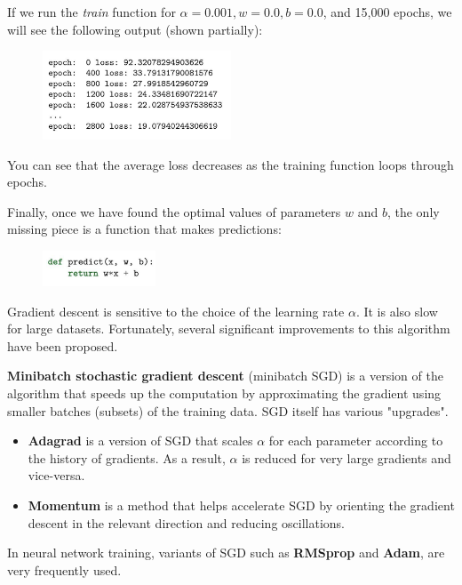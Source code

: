 \documentclass[9pt,dvipsnames]{beamer}
\begin{document}
\begin{frame}
	If we run the \textit{train} function for $\alpha=0.001, w=0.0, b=0.0$, and 15,000 epochs, we will see the following output (shown partially):
	\begin{figure}
		\centering
		\includegraphics[width=0.5\textwidth]{imgs/ana_ml_6.png}
	\end{figure}
	You can see that the average loss decreases as the training function loops through epochs. 
\end{frame}

\begin{frame}
	Finally, once we have found the optimal values of parameters $w$ and $b$, the only missing piece is a function that makes predictions:
	\begin{figure}
		\centering
		\includegraphics[width=0.3\textwidth]{imgs/ana_ml_7.png}
	\end{figure}
	Gradient descent is sensitive to the choice of the learning rate $\alpha$. It is also slow for large datasets. Fortunately, several significant improvements to this algorithm have been proposed.
	
	\textbf{Minibatch stochastic gradient descent} (minibatch SGD) is a version of the algorithm that speeds up the computation by approximating the gradient using smaller batches (subsets) of the training data. SGD itself has various "upgrades".
	\begin{itemize}
		\item  \textbf{Adagrad} is a version of SGD that scales $\alpha$ for each parameter according to the history of gradients. As a result, $\alpha$ is reduced for very large gradients and vice-versa.
		\item  \textbf{Momentum} is a method that helps accelerate SGD by orienting the gradient descent in the relevant direction and reducing oscillations.
	\end{itemize}
	 In neural network training, variants of SGD such as \textbf{RMSprop} and \textbf{Adam}, are very frequently used.
\end{frame}
\end{document}
